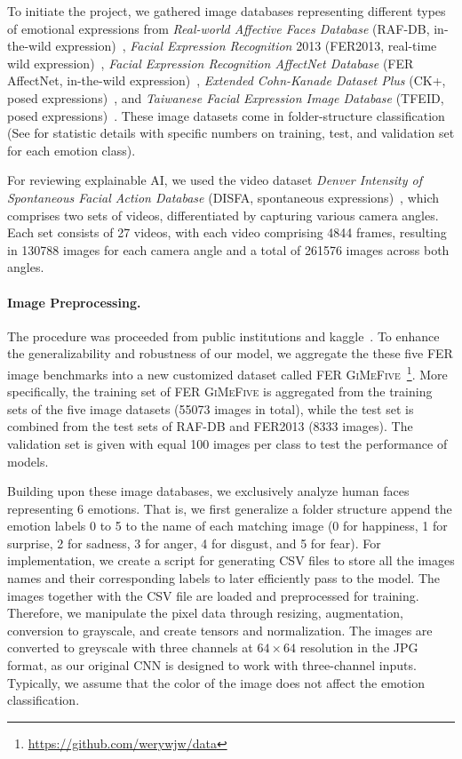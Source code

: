 To initiate the project, 
we gathered image databases representing different types of emotional expressions from 
\textit{Real-world Affective Faces Database} (RAF-DB, in-the-wild expression)~\cite{li_reliable_2017,li2019reliable}, 
\textit{Facial Expression Recognition} 2013 (FER2013, real-time wild expression)~\cite{BarsoumZCZ16}, 
\textit{Facial Expression Recognition AffectNet Database} (FER AffectNet, in-the-wild expression)~\cite{Mollah2019ANet}, 
\textit{Extended Cohn-Kanade Dataset Plus} (CK+, posed expressions)~\cite{LuceyCKSAM10}, 
and \textit{Taiwanese Facial Expression Image Database} (TFEID, posed expressions)~\cite{tfeid,LiGL22}.
These image datasets come in folder-structure classification (See  
for statistic details with specific numbers on training, test, and validation set for each emotion class). 

For reviewing explainable AI, 
we used the video dataset \textit{Denver Intensity of Spontaneous Facial Action Database} 
(DISFA, spontaneous expressions)~\cite{MavadatiMBTC13}, 
which comprises two sets of videos, 
differentiated by capturing various camera angles. 
Each set consists of 27 videos, with each video comprising 4844 frames, 
resulting in 130788 images for each camera angle and a total of 261576 images across both angles. 

\paragraph{Image Preprocessing.}
The procedure was proceeded from public institutions and kaggle~\cite{kaggle_rafdb,kagaff}. 
To enhance the generalizability and robustness of our model, 
we aggregate the these five FER image benchmarks into a new customized dataset called FER 
\textsc{GiMeFive}~\footnote{\url{https://github.com/werywjw/data}}. 
More specifically, 
the training set of FER \textsc{GiMeFive} is aggregated from the training sets of the five image datasets (55073 images in total), 
while the test set is combined from the test sets of RAF-DB and FER2013 (8333 images). 
The validation set is given with equal 100 images per class to test the performance of models. 

Building upon these image databases, we exclusively analyze human faces representing 6 emotions. 
That is, we first generalize a folder structure append the emotion labels 0 to 5 to the name of each matching image 
(0 for happiness, 1 for surprise, 2 for sadness, 3 for anger, 4 for disgust, and 5 for fear).
For implementation, 
we create a script for generating CSV files to store all the images names and their corresponding labels to later efficiently pass to the model. 
The images together with the CSV file are loaded and preprocessed for training. 
Therefore, we manipulate the pixel data through resizing, 
augmentation, conversion to grayscale, and create tensors and normalization. 
The images are converted to greyscale with three channels at $64 \times 64$ resolution in the JPG format, 
as our original CNN is designed to work with three-channel inputs. 
Typically, we assume that the color of the image does not affect the emotion classification. 

